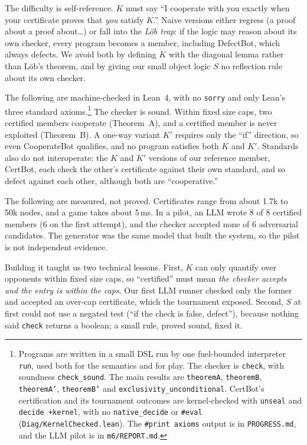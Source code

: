 \documentclass[11pt]{article}
\begin{document}
The difficulty is self-reference. $K$ must say ``I cooperate with you exactly when your certificate proves that \emph{you} satisfy $K$.'' Naive versions either regress (a proof about a proof about\ldots) or fall into the \emph{Löb trap}: if the logic may reason about its own checker, every program becomes a member, including DefectBot, which always defects. We avoid both by defining $K$ with the diagonal lemma rather than Löb's theorem, and by giving our small object logic $S$ no reflection rule about its own checker.

The following are machine-checked in Lean~4, with no \texttt{sorry} and only Lean's three standard axioms.\footnote{Programs are written in a small DSL run by one fuel-bounded interpreter \texttt{run}, used both for the semantics and for play. The checker is \texttt{check}, with soundness \texttt{check\_sound}. The main results are \texttt{theoremA}, \texttt{theoremB}, \texttt{theoremA'}, \texttt{theoremB'} and \texttt{exclusivity\_unconditional}. CertBot's certification and its tournament outcomes are kernel-checked with \texttt{unseal} and \texttt{decide +kernel}, with no \texttt{native\_decide} or \texttt{\#eval} (\texttt{Diag/KernelChecked.lean}). The \texttt{\#print axioms} output is in \texttt{PROGRESS.md}, and the LLM pilot is in \texttt{m6/REPORT.md}.} The checker is sound. Within fixed size caps, two certified members cooperate (Theorem~A), and a certified member is never exploited (Theorem~B). A one-way variant $K'$ requires only the ``if'' direction, so even CooperateBot qualifies, and no program satisfies both $K$ and $K'$. Standards also do not interoperate: the $K$ and $K'$ versions of our reference member, CertBot, each check the other's certificate against their own standard, and so defect against each other, although both are ``cooperative.''

The following are measured, not proved. Certificates range from about 1.7k to 50k nodes, and a game takes about 5\,ms. In a pilot, an LLM wrote 8 of 8 certified members (6 on the first attempt), and the checker accepted none of 6 adversarial candidates. The generator was the same model that built the system, so the pilot is not independent evidence.

Building it taught us two technical lessons. First, $K$ can only quantify over opponents within fixed size caps, so ``certified'' must mean \emph{the checker accepts and the entry is within the caps}. Our first LLM runner checked only the former and accepted an over-cap certificate, which the tournament exposed. Second, $S$ at first could not use a negated test (``if the check is false, defect''), because nothing said \texttt{check} returns a boolean; a small rule, proved sound, fixed it.
\end{document}
